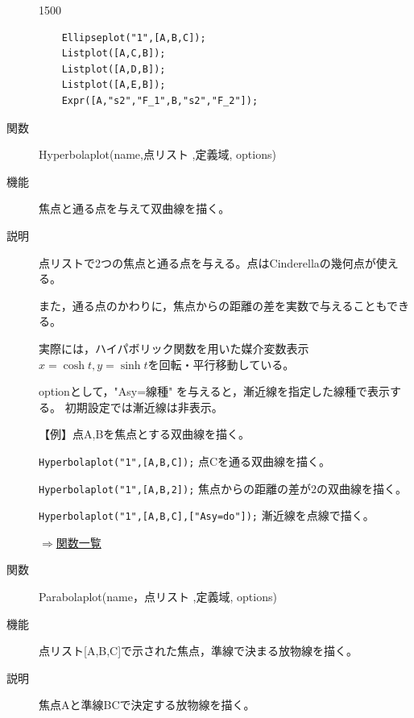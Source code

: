 \documentclass[papersize,a4paper,12pt,uplatex]{jsarticle}
\begin{document}
\begin{description}
\begin{layer}{150}{0}
\end{layer}
\begin{verbatim}
    Ellipseplot("1",[A,B,C]);
    Listplot([A,C,B]);
    Listplot([A,D,B]);
    Listplot([A,E,B]);
    Expr([A,"s2","F_1",B,"s2","F_2"]);
\end{verbatim}

\vspace{10mm}

\hypertarget{hyperbolaplot}{}
\item[関数]  Hyperbolaplot(name,点リスト ,定義域, options)
\item[機能]  焦点と通る点を与えて双曲線を描く。
\item[説明]  点リストで2つの焦点と通る点を与える。点はCinderellaの幾何点が使える。

また，通る点のかわりに，焦点からの距離の差を実数で与えることもできる。

実際には，ハイパボリック関数を用いた媒介変数表示 $x=\cosh t,y=\sinh t$を回転・平行移動している。

optionとして，"Asy=線種"  を与えると，漸近線を指定した線種で表示する。 初期設定では漸近線は非表示。
  
\vspace{\baselineskip}
【例】点A,Bを焦点とする双曲線を描く。

\verb|Hyperbolaplot("1",[A,B,C]);|     点Cを通る双曲線を描く。

\verb|Hyperbolaplot("1",[A,B,2]);|      焦点からの距離の差が2の双曲線を描く。

\verb|Hyperbolaplot("1",[A,B,C],["Asy=do"]);|   漸近線を点線で描く。

\vspace{\baselineskip}
\hspace{20mm} \scalebox{0.9}{}
\begin{flushright}  \hyperlink{functionlist}{$\Rightarrow$関数一覧}\end{flushright}

\vspace{\baselineskip}
\hypertarget{parabolaplot}{}
\item[関数]  Parabolaplot(name，点リスト ,定義域, options)
\item[機能]  点リスト[A,B,C]で示された焦点，準線で決まる放物線を描く。
\item[説明]  焦点Aと準線BCで決定する放物線を描く。


\end{description}
\end{document}
